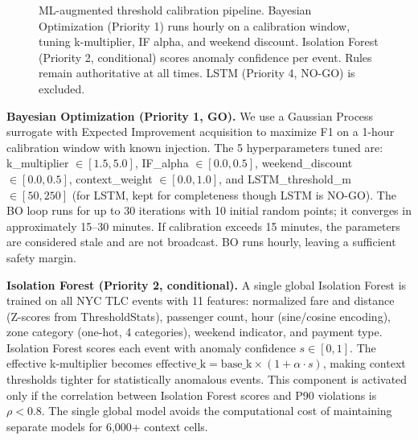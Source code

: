 \begin{figure}[htbp]
  \centering
  \caption{ML-augmented threshold calibration pipeline. Bayesian Optimization
    (Priority 1) runs hourly on a calibration window, tuning k-multiplier,
    IF alpha, and weekend discount. Isolation Forest (Priority 2, conditional)
    scores anomaly confidence per event. Rules remain authoritative at all times.
    LSTM (Priority 4, NO-GO) is excluded.}
  \label{fig:ml-architecture}
\end{figure}

\textbf{Bayesian Optimization (Priority 1, GO).} We use a Gaussian Process
surrogate with Expected Improvement acquisition to maximize F1 on a 1-hour
calibration window with known injection. The 5 hyperparameters tuned are:
k\_multiplier $\in [1.5, 5.0]$, IF\_alpha $\in [0.0, 0.5]$,
weekend\_discount $\in [0.0, 0.5]$, context\_weight $\in [0.0, 1.0]$,
and LSTM\_threshold\_m $\in [50, 250]$ (for LSTM, kept for completeness
though LSTM is NO-GO). The BO loop runs for up to 30 iterations with
10 initial random points; it converges in approximately 15--30 minutes.
If calibration exceeds 15 minutes, the parameters are considered stale
and are not broadcast. BO runs hourly, leaving a sufficient safety margin.

\textbf{Isolation Forest (Priority 2, conditional).} A single global
Isolation Forest \citep{iforest2008} is trained on all NYC TLC events
with 11 features: normalized fare and distance (Z-scores from ThresholdStats),
passenger count, hour (sine/cosine encoding), zone category (one-hot, 4
categories), weekend indicator, and payment type. Isolation Forest scores
each event with anomaly confidence $s \in [0, 1]$. The effective k-multiplier
becomes $\text{effective\_k} = \text{base\_k} \times (1 + \alpha \cdot s)$,
making context thresholds tighter for statistically anomalous events.
This component is activated only if the correlation between Isolation Forest
scores and P90 violations is $\rho < 0.8$. The single global model avoids
the computational cost of maintaining separate models for 6,000+ context cells.

